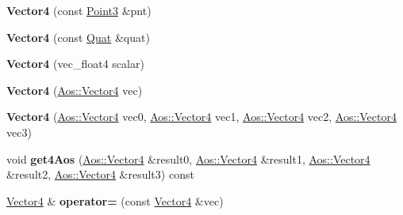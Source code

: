 \begin{DoxyCompactItemize}
\item 
\hypertarget{classVectormath_1_1Soa_1_1Vector4_a6a58e93245f9f0d21c513ad9c56ba162}{{\bfseries Vector4} (const \hyperlink{classVectormath_1_1Soa_1_1Point3}{Point3} \&pnt)}\label{classVectormath_1_1Soa_1_1Vector4_a6a58e93245f9f0d21c513ad9c56ba162}

\item 
\hypertarget{classVectormath_1_1Soa_1_1Vector4_ab92c30759ff0fbe919675479b5d0d2e6}{{\bfseries Vector4} (const \hyperlink{classVectormath_1_1Soa_1_1Quat}{Quat} \&quat)}\label{classVectormath_1_1Soa_1_1Vector4_ab92c30759ff0fbe919675479b5d0d2e6}

\item 
\hypertarget{classVectormath_1_1Soa_1_1Vector4_a3b92a376c6943e1c98d1743a6e52c4c3}{{\bfseries Vector4} (vec\-\_\-float4 scalar)}\label{classVectormath_1_1Soa_1_1Vector4_a3b92a376c6943e1c98d1743a6e52c4c3}

\item 
\hypertarget{classVectormath_1_1Soa_1_1Vector4_a9ba12673c1971d723aa063d4b78fe498}{{\bfseries Vector4} (\hyperlink{classVectormath_1_1Aos_1_1Vector4}{Aos\-::\-Vector4} vec)}\label{classVectormath_1_1Soa_1_1Vector4_a9ba12673c1971d723aa063d4b78fe498}

\item 
\hypertarget{classVectormath_1_1Soa_1_1Vector4_a965781b287b75c1c822f82ca71e451ae}{{\bfseries Vector4} (\hyperlink{classVectormath_1_1Aos_1_1Vector4}{Aos\-::\-Vector4} vec0, \hyperlink{classVectormath_1_1Aos_1_1Vector4}{Aos\-::\-Vector4} vec1, \hyperlink{classVectormath_1_1Aos_1_1Vector4}{Aos\-::\-Vector4} vec2, \hyperlink{classVectormath_1_1Aos_1_1Vector4}{Aos\-::\-Vector4} vec3)}\label{classVectormath_1_1Soa_1_1Vector4_a965781b287b75c1c822f82ca71e451ae}

\item 
\hypertarget{classVectormath_1_1Soa_1_1Vector4_a73b9de38bd4999068db7edcc07c5d3bd}{void {\bfseries get4\-Aos} (\hyperlink{classVectormath_1_1Aos_1_1Vector4}{Aos\-::\-Vector4} \&result0, \hyperlink{classVectormath_1_1Aos_1_1Vector4}{Aos\-::\-Vector4} \&result1, \hyperlink{classVectormath_1_1Aos_1_1Vector4}{Aos\-::\-Vector4} \&result2, \hyperlink{classVectormath_1_1Aos_1_1Vector4}{Aos\-::\-Vector4} \&result3) const }\label{classVectormath_1_1Soa_1_1Vector4_a73b9de38bd4999068db7edcc07c5d3bd}

\item 
\hypertarget{classVectormath_1_1Soa_1_1Vector4_ad1313fe4e669802ad1388a5524bf54a2}{\hyperlink{classVectormath_1_1Soa_1_1Vector4}{Vector4} \& {\bfseries operator=} (const \hyperlink{classVectormath_1_1Soa_1_1Vector4}{Vector4} \&vec)}\label{classVectormath_1_1Soa_1_1Vector4_ad1313fe4e669802ad1388a5524bf54a2}


\end{DoxyCompactItemize}
